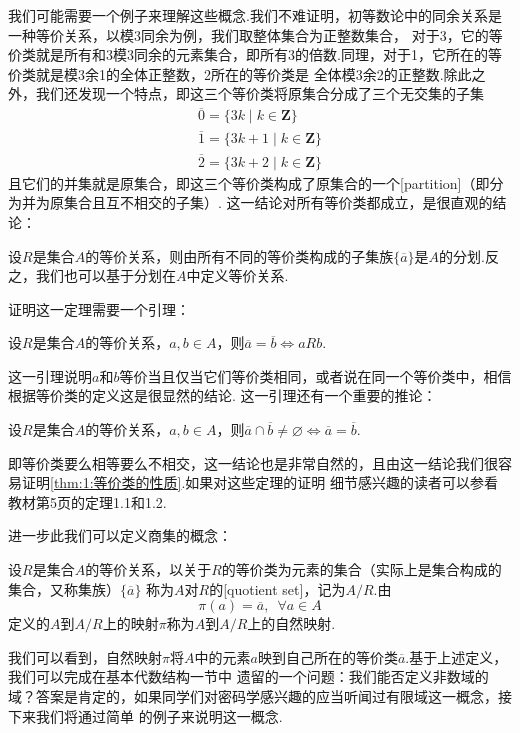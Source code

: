 我们可能需要一个例子来理解这些概念.我们不难证明，初等数论中的同余关系是一种等价关系，以模3同余为例，我们取整体集合为正整数集合，
对于3，它的等价类就是所有和3模3同余的元素集合，即所有3的倍数.同理，对于1，它所在的等价类就是模3余1的全体正整数，2所在的等价类是
全体模3余2的正整数.除此之外，我们还发现一个特点，即这三个等价类将原集合分成了三个无交集的子集
\begin{gather*}
    \overline{0}=\{3k\mid k\in\mathbf{Z}\}\\
    \overline{1}=\{3k+1\mid k\in\mathbf{Z}\}\\
    \overline{2}=\{3k+2\mid k\in\mathbf{Z}\}
\end{gather*}
且它们的并集就是原集合，即这三个等价类构成了原集合的一个[partition]（即分为并为原集合且互不相交的子集）.
这一结论对所有等价类都成立，是很直观的结论：
\begin{theorem}\label{thm:1:等价类的性质}
    设$R$是集合$A$的等价关系，则由所有不同的等价类构成的子集族$\{\overline{a}\}$是$A$的分划.反之，我们也可以基于分划在$A$中定义等价关系.
\end{theorem}
证明这一定理需要一个引理：
\begin{lemma}
    设$R$是集合$A$的等价关系，$a,b\in A$，则$\overline{a}=\overline{b}\iff aRb$.
\end{lemma}
这一引理说明$a$和$b$等价当且仅当它们等价类相同，或者说在同一个等价类中，相信根据等价类的定义这是很显然的结论.
这一引理还有一个重要的推论：
\begin{corollary}
    设$R$是集合$A$的等价关系，$a,b\in A$，则$\overline{a}\cap\overline{b}\neq\varnothing\iff\overline{a}=\overline{b}$.
\end{corollary}
即等价类要么相等要么不相交，这一结论也是非常自然的，且由这一结论我们很容易证明\autoref{thm:1:等价类的性质}.如果对这些定理的证明
细节感兴趣的读者可以参看教材第5页的定理1.1和1.2.

进一步此我们可以定义商集的概念：
\begin{definition}
    设$R$是集合$A$的等价关系，以关于$R$的等价类为元素的集合（实际上是集合构成的集合，又称集族）$\{\overline{a}\}$
    称为$A$对$R$的[quotient set]，记为$A/R$.由
    \[\pi(a) = \overline{a}, \enspace \forall a\in A\]
    定义的$A$到$A/R$上的映射$\pi$称为$A$到$A/R$上的自然映射.
\end{definition}
我们可以看到，自然映射$\pi$将$A$中的元素$a$映到自己所在的等价类$\overline{a}$.基于上述定义，我们可以完成在基本代数结构一节中
遗留的一个问题：我们能否定义非数域的域？答案是肯定的，如果同学们对密码学感兴趣的应当听闻过有限域这一概念，接下来我们将通过简单
的例子来说明这一概念.

